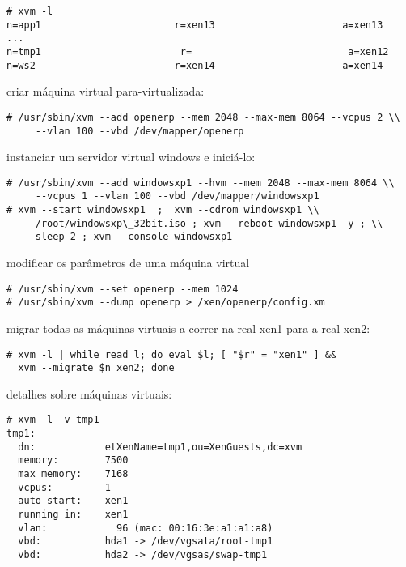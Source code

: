 \begin{Verbatim}[commandchars=\\\{\}]
# xvm -l
n=app1                       r=xen13                      a=xen13
...
n=tmp1                        r=                           a=xen12
n=ws2                        r=xen14                      a=xen14
\end{Verbatim}

criar máquina virtual para-virtualizada:

\begin{Verbatim}[commandchars=\\\{\}]
# /usr/sbin/xvm --add openerp --mem 2048 --max-mem 8064 --vcpus 2 \\
     --vlan 100 --vbd /dev/mapper/openerp
\end{Verbatim}

instanciar um servidor virtual windows e iniciá-lo:

\begin{Verbatim}[commandchars=\\\{\}]
# /usr/sbin/xvm --add windowsxp1 --hvm --mem 2048 --max-mem 8064 \\
     --vcpus 1 --vlan 100 --vbd /dev/mapper/windowsxp1
# xvm --start windowsxp1  ;  xvm --cdrom windowsxp1 \\
     /root/windowsxp\_32bit.iso ; xvm --reboot windowsxp1 -y ; \\
     sleep 2 ; xvm --console windowsxp1
\end{Verbatim}

modificar os parâmetros de uma máquina virtual

\begin{Verbatim}[commandchars=\\\{\}]
# /usr/sbin/xvm --set openerp --mem 1024
# /usr/sbin/xvm --dump openerp > /xen/openerp/config.xm
\end{Verbatim}

migrar todas as máquinas virtuais a correr na real xen1 para a real xen2:

\begin{Verbatim}[commandchars=\\\{\}]
# xvm -l | while read l; do eval $l; [ "$r" = "xen1" ] &&
  xvm --migrate $n xen2; done
\end{Verbatim}

detalhes sobre máquinas virtuais:

\begin{Verbatim}[commandchars=\\\{\}]
# xvm -l -v tmp1
tmp1:
  dn:            etXenName=tmp1,ou=XenGuests,dc=xvm
  memory:        7500
  max memory:    7168
  vcpus:         1
  auto start:    xen1
  running in:    xen1
  vlan:            96 (mac: 00:16:3e:a1:a1:a8)
  vbd:           hda1 -> /dev/vgsata/root-tmp1
  vbd:           hda2 -> /dev/vgsas/swap-tmp1
\end{Verbatim}


